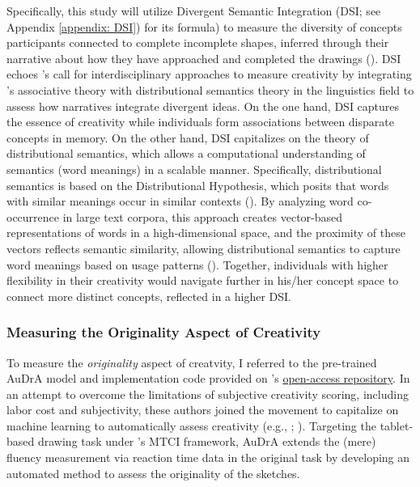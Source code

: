 \documentclass[../MA_Thesis.tex]{subfiles}
\begin{document}
Specifically, this study will utilize Divergent Semantic Integration (DSI; see Appendix \ref{appendix: DSI}) for its formula) to measure the diversity of concepts participants connected to complete incomplete shapes, inferred through their narrative about how they have approached and completed the drawings (\cite{johnson_divergent_2022}). DSI echoes \textcite{kaufman_cambridge_2010}'s call for interdisciplinary approaches to measure creativity by integrating \textcite{mednick_associative_1962}'s associative theory with distributional semantics theory in the linguistics field to assess how narratives integrate divergent ideas. On the one hand, DSI captures the essence of creativity while individuals form associations between disparate concepts in memory. On the other hand, DSI capitalizes on the theory of distributional semantics, which allows a computational understanding of semantics (word meanings) in a scalable manner. Specifically, distributional semantics is based on the Distributional Hypothesis, which posits that words with similar meanings occur in similar contexts (\cite{lenci_distributional_2008}). By analyzing word co-occurrence in large text corpora, this approach creates vector-based representations of words in a high-dimensional space, and the proximity of these vectors reflects semantic similarity, allowing distributional semantics to capture word meanings based on usage patterns (\cite{boleda_distributional_2020}). Together, individuals with higher flexibility in their creativity would navigate further in his/her concept space to connect more distinct concepts, reflected in a higher DSI.

\subsubsection*{Measuring the Originality Aspect of Creativity}
To measure the \textit{originality} aspect of creatvity, I referred to the pre-trained AuDrA model and implementation code provided on \textcite{patterson_audra_2023}'s \href{https://osf.io/kqn9v/}{open-access repository}. In an attempt to overcome the limitations of subjective creativity scoring, including labor cost and subjectivity, these authors joined the movement to capitalize on machine learning to automatically assess creativity (e.g., \cite{acar_applying_2023}; \cite{beaty_automating_2021}). Targeting the tablet-based drawing task under \textcite{barbot_dynamics_2018}'s MTCI framework, AuDrA extends the (mere) fluency measurement via reaction time data in the original task by developing an automated method to assess the originality of the sketches.
\end{document}
